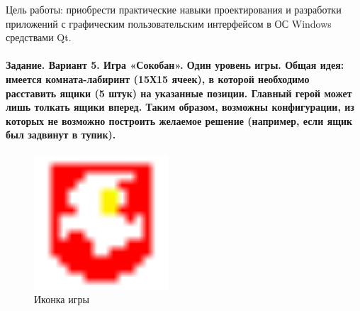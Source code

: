 Цель работы:
приобрести практические навыки проектирования и разработки приложений с графическим пользовательским интерфейсом в ОС Windows средствами Qt.

\paragraph{
    Задание.
    Вариант 5.
    Игра «Сокобан». Один уровень игры.
    Общая идея: имеется комната-лабиринт (15Х15 ячеек),
    в которой необходимо расставить ящики (5 штук) на указанные позиции.
    Главный герой может лишь толкать ящики вперед.
    Таким образом, возможны конфигурации, из которых не возможно построить желаемое решение
    (например, если ящик был задвинут в тупик).
} \hspace{0pt}

\begin{figure}[h]
    \centering
    \includegraphics[width=5cm]
    {../src/QtSokoban/_pics/favicon.png}
    \caption{Иконка игры}
\end{figure}

